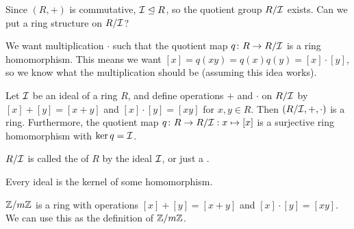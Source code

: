 \documentclass[12pt,letterpaper]{report}
\begin{document}
Since $(R, +)$ is commutative, $\mathcal{I} \trianglelefteq R$, so the quotient group $R/\mathcal{I}$ exists.
Can we put a ring structure on $R/\mathcal{I}$?

We want multiplication $\cdot$ such that the quotient map $q \colon R \to R/\mathcal{I}$ is a ring
homomorphism.
This means we want $[x] = q(xy) = q(x)q(y) = [x] \cdot [y]$, so we know what the multiplication
should be (assuming this idea works).

\begin{thm}{}{}
  Let $\mathcal{I}$ be an ideal of a ring $R$, and define operations $+$ and $\cdot$ on $R/\mathcal{I}$ by
  $[x] + [y] = [x + y]$ and $[x] \cdot [y] = [xy]$ for $x, y \in R$.
  Then $(R/\mathcal{I}, +, \cdot)$ is a ring.
  Furthermore, the quotient map $q \colon R \to R/\mathcal{I} : x \mapsto [x]$ is a surjective ring
  homomorphism with $\ker q = \mathcal{I}$.
\end{thm}

$R/\mathcal{I}$ is called the  of $R$ by the ideal $\mathcal{I}$, or just a
.

\begin{cor}{}{}
  Every ideal is the kernel of some homomorphism.
\end{cor}

\begin{ex}
  $\mathbb{Z}/{m}\mathbb{Z}$ is a ring with operations $[x] + [y] = [x + y]$ and $[x] \cdot [y] = [xy]$.
  We can use this as the definition of $\mathbb{Z}/{m}\mathbb{Z}$.
\end{ex}
\end{document}
